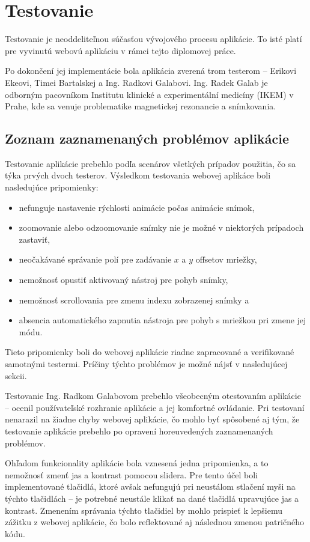 \chapter {Testovanie}
Testovanie je neoddeliteľnou súčasťou vývojového procesu aplikácie. To isté platí pre vyvinutú webovú aplikáciu v rámci tejto diplomovej práce.

Po dokončení jej implementácie bola aplikácia zverená trom testerom -- Erikovi Ekeovi, Timei Bartalskej a Ing. Radkovi Galabovi. Ing. Radek Galab je odborným pacovníkom Institutu klinické a experimentální medicíny (IKEM) v Prahe, kde sa venuje problematike magnetickej rezonancie a snímkovania.

\section {Zoznam zaznamenaných problémov aplikácie}
Testovanie aplikácie prebehlo podľa scenárov všetkých prípadov použitia, čo sa týka prvých dvoch testerov. Výsledkom testovania webovej aplikáce boli nasledujúce pripomienky:
\begin {itemize}
\item {nefunguje nastavenie rýchlosti animácie počas animácie snímok,}
\item {zoomovanie alebo odzoomovanie snímky nie je možné v niektorých prípadoch zastaviť,}
\item {neočakávané správanie polí pre zadávanie $x$ a $y$ offsetov mriežky,}
\item {nemožnosť opustiť aktivovaný nástroj pre pohyb snímky,}
\item {nemožnosť scrollovania pre zmenu indexu zobrazenej snímky a}
\item {absencia automatického zapnutia nástroja pre pohyb s mriežkou pri zmene jej módu.}
\end {itemize}

Tieto pripomienky boli do webovej aplikácie riadne zapracované a verifikované samotnými testermi.
Príčiny týchto problémov je možné nájsť v nasledujúcej sekcii.

Testovanie Ing. Radkom Galabovom prebehlo všeobecným otestovaním aplikácie -- ocenil používateľské rozhranie aplikácie a jej komfortné ovládanie. Pri testovaní nenarazil na žiadne chyby webovej aplikácie, čo mohlo byť spôsobené aj tým, že testovanie aplikácie prebehlo po opravení horeuvedených zaznamenaných problémov.

Ohľadom funkcionality aplikácie bola vznesená jedna pripomienka, a to nemožnosť zmenť jas a kontrast pomocou slidera. Pre tento účel boli implementované tlačidlá, ktoré avšak nefungujú pri neustálom stlačení myši na týchto tlačidlách -- je potrebné neustále klikať na dané tlačidlá upravujúce jas a kontrast. Zmenením správania týchto tlačidiel by mohlo prispieť k lepšiemu zážitku z webovej aplikácie, čo bolo reflektované aj následnou zmenou patričného kódu. 

